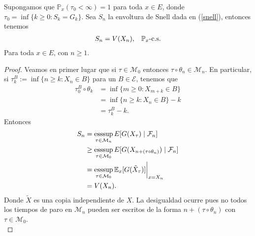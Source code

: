 \begin{lemma}
Supongamos que $\mathbb{P}_x(\tau_0 < \infty) = 1$ para toda $x \in E$, donde $\tau_0 = \inf \{k \geq 0 : S_k = G_k\}$. Sea $S_n$ la envoltura de Snell dada en (\ref{snell}), entonces tenemos
	\begin{align}
	S_n = V(X_n), \hspace{0.3cm} \mathbb{P}_x\text{-c.s.} \label{abt}
	\end{align}
Para toda $x \in E$, con $n \geq 1$.
\end{lemma}
\begin{proof}
Veamos en primer lugar que si $\tau \in \mathcal{M}_0$ entonces $\tau \circ \theta_n \in \mathcal{M}_n$. En particular, si $\tau_k^B := \inf \{n \geq k : X_n \in B\}$ para un $B \in \mathcal{E}$, tenemos que
	\begin{align*}
	\tau_0^B \circ \theta_k & = \inf \{m \geq 0 : X_{m+k} \in B\} \\
	& = \inf \{n \geq k : X_n \in B\} - k \\
	& = \tau_k^B - k.
	\end{align*}
Entonces
	\begin{align}
	S_n & =  \operatorname*{esssup}_{\tau \in \mathcal{M}_n} E[G(X_\tau) \mid \mathcal{F}_n] \nonumber \\
	& \geq \operatorname*{esssup}_{\tau \in \mathcal{M}_0} E[G(X_{n+ (\tau \circ \theta_n)}) \mid \mathcal{F}_n] \nonumber \\
	& =  \operatorname*{esssup}_{\tau \in \mathcal{M}_0} \mathbb{E}_x [G(\tilde{X}_\tau)] \bigg|_{x = X_n} \nonumber \\
	& = V(X_n). \label{abp}
	\end{align}
Donde $\tilde{X}$ es una copia independiente de $X$. La desigualdad ocurre pues no todos los tiempos de paro en $\mathcal{M}_n$ pueden ser escritos de la forma $n+ (\tau \circ \theta_n)$ con $\tau \in \mathcal{M}_0$. \\


\end{proof}

